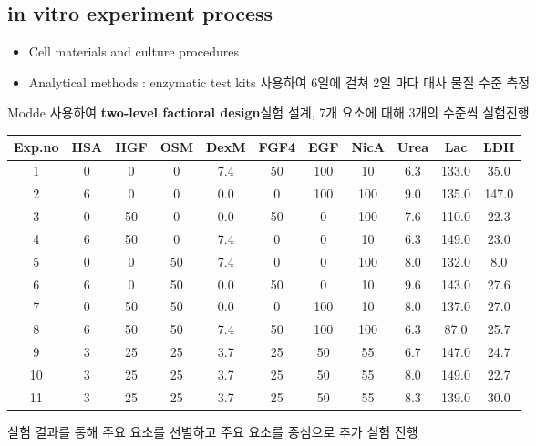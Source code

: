 \documentclass{article}
\begin{document}
\subsection{in vitro experiment process}
\begin{itemize}
    \item Cell materials and culture procedures
    \item Analytical methods : enzymatic test kits 사용하여 6일에 걸쳐 2일 마다 대사 물질 수준 측정
\end{itemize}
Modde 사용하여 \textbf{two-level factioral design}실험 설계, 7개 요소에 대해 3개의 수준씩 실험진행 
\begin{center}
    \begin{tabular}{||c | c c c c c c c | c c c||} 
     \hline
     Exp.no&  HSA & HGF & OSM  &DexM&  FGF4 & EGF & NicA  &Urea  &  Lac  &  LDH\\
     \hline\hline
     1&0&0&0&7.4&50&100&10&6.3&133.0&35.0\\
     2&6&0&0&0.0&0&100&100&9.0&135.0&147.0\\
     3&0&50&0&0.0&50&0&100&7.6&110.0&22.3\\
     4&6&50&0&7.4&0&0&10&6.3&149.0&23.0\\
     5&0&0&50&7.4&0&0&100&8.0&132.0&8.0\\
     6&6&0&50&0.0&50&0&10&9.6&143.0&27.6\\
     7&0&50&50&0.0&0&100&10&8.0&137.0&27.0\\
     8&6&50&50&7.4&50&100&100&6.3&87.0&25.7\\
     9&3&25&25&3.7&25&50&55&6.7&147.0&24.7\\
     10&3&25&25&3.7&25&50&55&8.0&149.0&22.7\\
     11&3&25&25&3.7&25&50&55&8.3&139.0&30.0\\
     \hline
    \end{tabular}
\end{center}
실험 결과를 통해 주요 요소를 선별하고 주요 요소를 중심으로 추가 실험 진행 
\end{document}
